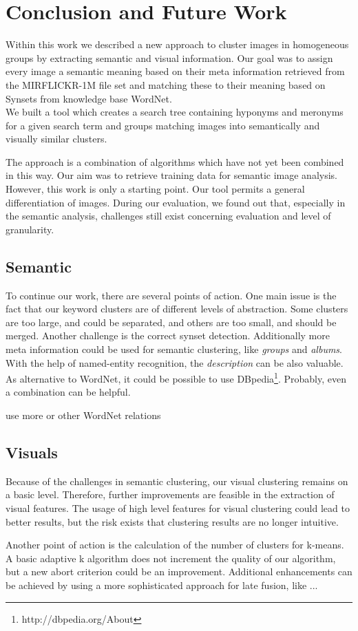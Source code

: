 %
\section{Conclusion and Future Work}
\label{sec_future}

Within this work we described a new approach to cluster images in homogeneous groups by extracting semantic and visual information. Our goal was to assign every image a semantic meaning based on their meta information retrieved from the MIRFLICKR-1M file set and matching these to their meaning based on Synsets from knowledge base WordNet.
\\ We built a tool which creates a search tree containing hyponyms and meronyms for a given search term and groups matching images into semantically and visually similar clusters.

\bigskip
The approach is a combination of algorithms which have not yet been combined in this way. Our aim was to retrieve training data for semantic image analysis. However, this work is only a starting point. Our tool permits a general differentiation of images. During our evaluation, we found out that, especially in the semantic analysis, challenges still exist concerning evaluation and level of granularity.

\subsection{Semantic}
To continue our work, there are several points of action. One main issue is the fact that our keyword clusters are of different levels of abstraction. Some clusters are too large, and could be separated, and others are too small, and should be merged. Another challenge is the correct synset detection. Additionally more meta information could be used for semantic clustering, like \emph{groups} and \emph{albums}. With the help of named-entity recognition, the \emph{description} can be also valuable. As alternative to WordNet, it could be possible to use DBpedia\footnote{http://dbpedia.org/About}. Probably, even a combination can be helpful.

use more or other WordNet relations

\subsection{Visuals}

Because of the challenges in semantic clustering, our visual clustering remains on a basic level. Therefore, further improvements are feasible in the extraction of visual features. The usage of high level features for visual clustering could lead to better results, but the risk exists that clustering results are no longer intuitive. 

Another point of action is the calculation of the number of clusters for k-means. A basic adaptive k algorithm does not increment the quality of our algorithm, but a new abort criterion could be an improvement. Additional enhancements can be achieved by using a more sophisticated approach for late fusion, like ...  